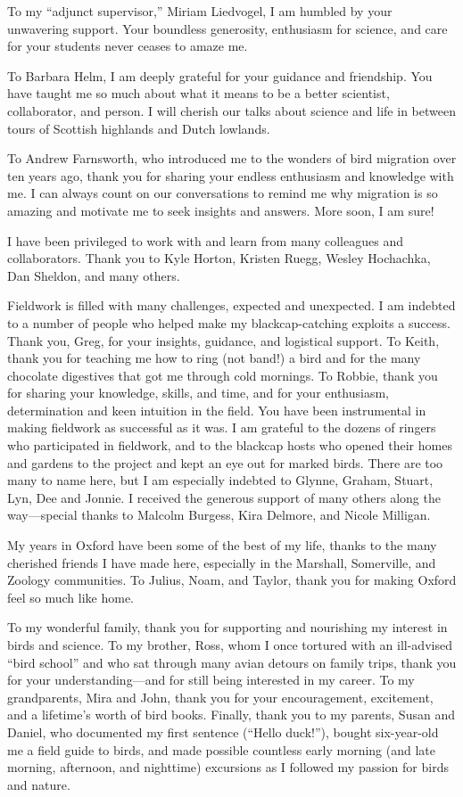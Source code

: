 \documentclass[a4paper, nobind]{templates/ociamthesis}
\begin{document}
\begin{romanpages}
\begin{acknowledgements}
To my ``adjunct supervisor,'' Miriam Liedvogel, I am humbled by your unwavering support. Your boundless generosity, enthusiasm for science, and care for your students never ceases to amaze me.

To Barbara Helm, I am deeply grateful for your guidance and friendship. You have taught me so much about what it means to be a better scientist, collaborator, and person. I will cherish our talks about science and life in between tours of Scottish highlands and Dutch lowlands.

To Andrew Farnsworth, who introduced me to the wonders of bird migration over ten years ago, thank you for sharing your endless enthusiasm and knowledge with me. I can always count on our conversations to remind me why migration is so amazing and motivate me to seek insights and answers. More soon, I am sure!

I have been privileged to work with and learn from many colleagues and collaborators. Thank you to Kyle Horton, Kristen Ruegg, Wesley Hochachka, Dan Sheldon, and many others.

Fieldwork is filled with many challenges, expected and unexpected. I am indebted to a number of people who helped make my blackcap-catching exploits a success. Thank you, Greg, for your insights, guidance, and logistical support. To Keith, thank you for teaching me how to ring (not band!) a bird and for the many chocolate digestives that got me through cold mornings. To Robbie, thank you for sharing your knowledge, skills, and time, and for your enthusiasm, determination and keen intuition in the field. You have been instrumental in making fieldwork as successful as it was. I am grateful to the dozens of ringers who participated in fieldwork, and to the blackcap hosts who opened their homes and gardens to the project and kept an eye out for marked birds. There are too many to name here, but I am especially indebted to Glynne, Graham, Stuart, Lyn, Dee and Jonnie. I received the generous support of many others along the way---special thanks to Malcolm Burgess, Kira Delmore, and Nicole Milligan.

My years in Oxford have been some of the best of my life, thanks to the many cherished friends I have made here, especially in the Marshall, Somerville, and Zoology communities.
To Julius, Noam, and Taylor, thank you for making Oxford feel so much like home.

To my wonderful family, thank you for supporting and nourishing my interest in birds and science. To my brother, Ross, whom I once tortured with an ill-advised ``bird school'' and who sat through many avian detours on family trips, thank you for your understanding---and for still being interested in my career. To my grandparents, Mira and John, thank you for your encouragement, excitement, and a lifetime's worth of bird books. Finally, thank you to my parents, Susan and Daniel, who documented my first sentence (``Hello duck!''), bought six-year-old me a field guide to birds, and made possible countless early morning (and late morning, afternoon, and nighttime) excursions as I followed my passion for birds and nature.
\end{acknowledgements}


\end{romanpages}
\end{document}
